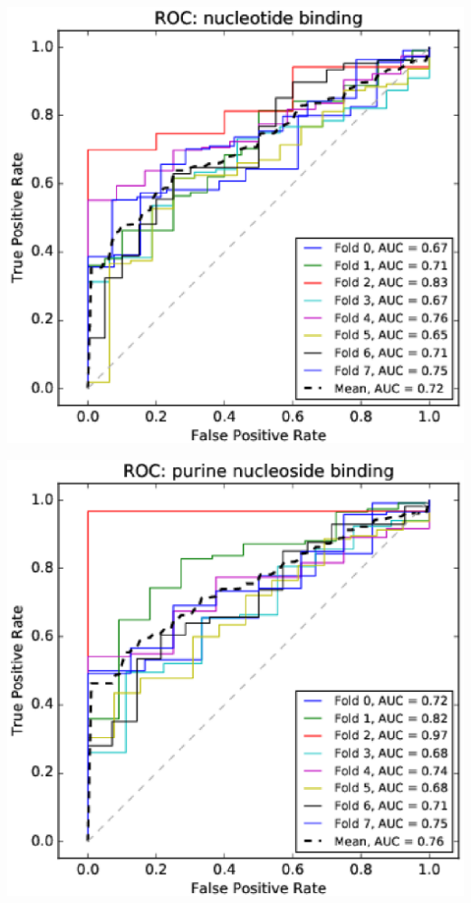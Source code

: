 \documentclass[11pt,twoside,a4paper]{book}
\newenvironment{Figure}
  {\par\medskip\noindent\minipage{\linewidth}}
  {\endminipage\par\medskip}
\begin{document}
\begin{multicols}{2}
\begin{Figure}\begin{center}\includegraphics[width=\linewidth]{figures/roc_nucleotide_binding}\label{fig:roc_nucleotide_binding}\end{center}\end{Figure}
\begin{Figure}\begin{center}\includegraphics[width=\linewidth]{figures/roc_purine_nucleoside_binding}\label{fig:roc_purine_nucleoside_binding}\end{center}\end{Figure}

\end{multicols}
\end{document}
